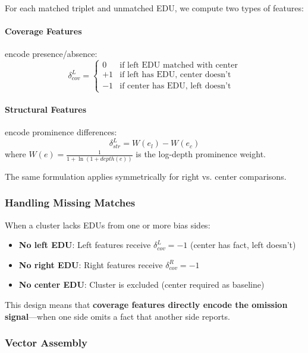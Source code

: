 \documentclass[11pt]{article}
\begin{document}
For each matched triplet and unmatched EDU, we compute two types of features:

\paragraph{Coverage Features} encode presence/absence:
\begin{equation}
\delta_{cov}^{L} = \begin{cases}
0 & \text{if left EDU matched with center} \\
+1 & \text{if left has EDU, center doesn't} \\
-1 & \text{if center has EDU, left doesn't}
\end{cases}
\end{equation}

\paragraph{Structural Features} encode prominence differences:
\begin{equation}
\delta_{str}^{L} = W(e_l) - W(e_c)
\end{equation}
where $W(e) = \frac{1}{1 + \ln(1 + depth(e))}$ is the log-depth prominence weight.

The same formulation applies symmetrically for right vs. center comparisons.

\subsubsection{Handling Missing Matches}

When a cluster lacks EDUs from one or more bias sides:
\begin{itemize}
    \item \textbf{No left EDU}: Left features receive $\delta_{cov}^L = -1$ (center has fact, left doesn't)
    \item \textbf{No right EDU}: Right features receive $\delta_{cov}^R = -1$
    \item \textbf{No center EDU}: Cluster is excluded (center required as baseline)
\end{itemize}

This design means that \textbf{coverage features directly encode the omission signal}---when one side omits a fact that another side reports.

\subsubsection{Vector Assembly}
\end{document}
